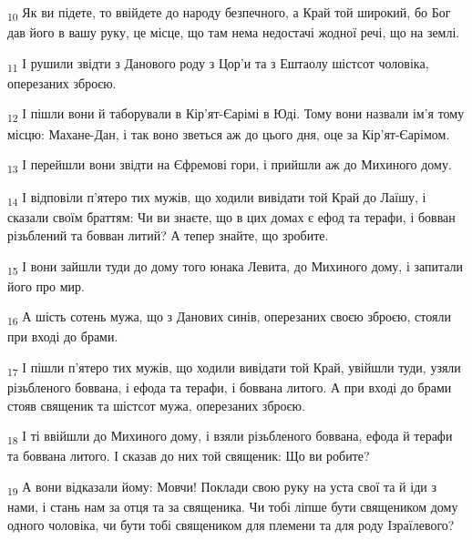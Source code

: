 \begin{tcolorbox}
\textsubscript{10} Як ви підете, то ввійдете до народу безпечного, а Край той широкий, бо Бог дав його в вашу руку, це місце, що там нема недостачі жодної речі, що на землі.
\end{tcolorbox}
\begin{tcolorbox}
\textsubscript{11} І рушили звідти з Данового роду з Цор'и та з Ештаолу шістсот чоловіка, оперезаних зброєю.
\end{tcolorbox}
\begin{tcolorbox}
\textsubscript{12} І пішли вони й таборували в Кір'ят-Єарімі в Юді. Тому вони назвали ім'я тому місцю: Махане-Дан, і так воно зветься аж до цього дня, оце за Кір'ят-Єарімом.
\end{tcolorbox}
\begin{tcolorbox}
\textsubscript{13} І перейшли вони звідти на Єфремові гори, і прийшли аж до Михиного дому.
\end{tcolorbox}
\begin{tcolorbox}
\textsubscript{14} І відповіли п'ятеро тих мужів, що ходили вивідати той Край до Лаїшу, і сказали своїм браттям: Чи ви знаєте, що в цих домах є ефод та терафи, і бовван різьблений та бовван литий? А тепер знайте, що зробите.
\end{tcolorbox}
\begin{tcolorbox}
\textsubscript{15} І вони зайшли туди до дому того юнака Левита, до Михиного дому, і запитали його про мир.
\end{tcolorbox}
\begin{tcolorbox}
\textsubscript{16} А шість сотень мужа, що з Данових синів, оперезаних своєю зброєю, стояли при вході до брами.
\end{tcolorbox}
\begin{tcolorbox}
\textsubscript{17} І пішли п'ятеро тих мужів, що ходили вивідати той Край, увійшли туди, узяли різьбленого боввана, і ефода та терафи, і боввана литого. А при вході до брами стояв священик та шістсот мужа, оперезаних зброєю.
\end{tcolorbox}
\begin{tcolorbox}
\textsubscript{18} І ті ввійшли до Михиного дому, і взяли різьбленого боввана, ефода й терафи та боввана литого. І сказав до них той священик: Що ви робите?
\end{tcolorbox}
\begin{tcolorbox}
\textsubscript{19} А вони відказали йому: Мовчи! Поклади свою руку на уста свої та й іди з нами, і стань нам за отця та за священика. Чи тобі ліпше бути священиком дому одного чоловіка, чи бути тобі священиком для племени та для роду Ізраїлевого?
\end{tcolorbox}
